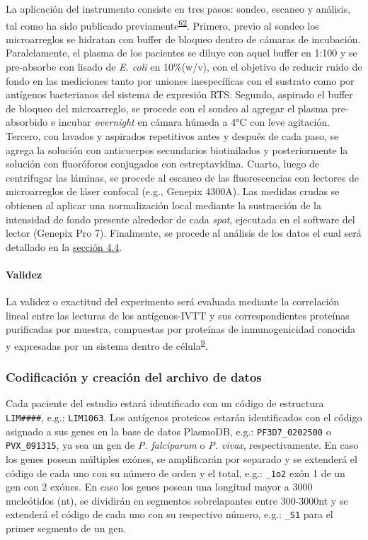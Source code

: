 \documentclass[a4paper]{article}
\let\oldparagraph\paragraph
\renewcommand{\paragraph}[1]{\oldparagraph{#1}\mbox{}}
\begin{document}
La aplicación del instrumento consiste en tres pasos: sondeo, escaneo y
análisis, tal como ha sido publicado
previamente\textsuperscript{\protect\hyperlink{ref-Driguez2015}{62}}.
Primero, previo al sondeo los microarreglos se hidratan con buffer de
bloqueo dentro de cámaras de incubación. Paralelamente, el plasma de los
pacientes se diluye con aquel buffer en 1:100 y se pre-absorbe con
lisado de \emph{E. coli} en 10\%(w/v), con el objetivo de reducir ruido
de fondo en las mediciones tanto por uniones inespecíficas con el
sustrato como por antígenos bacterianos del sistema de expresión RTS.
Segundo, aspirado el buffer de bloqueo del microarreglo, se procede con
el sondeo al agregar el plasma pre-absorbido e incubar \emph{overnight}
en cámara húmeda a 4°C con leve agitación. Tercero, con lavados y
aspirados repetitivos antes y después de cada paso, se agrega la
solución con anticuerpos secundarios biotinilados y posteriormente la
solución con fluoróforos conjugados con estreptavidina. Cuarto, luego de
centrifugar las láminas, se procede al escaneo de las fluorescencias con
lectores de microarreglos de láser confocal (e.g., Genepix 4300A). Las
medidas crudas se obtienen al aplicar una normalización local mediante
la sustracción de la intensidad de fondo presente alrededor de cada
\emph{spot}, ejecutada en el software del lector (Genepix Pro 7).
Finalmente, se procede al análisis de los datos el cual será detallado
en la \protect\hyperlink{anadata}{sección 4.4}.

\hypertarget{validez}{\paragraph{Validez}\label{validez}}

La validez o exactitud del experimento será evaluada mediante la
correlación lineal entre las lecturas de los antígenos-IVTT y sus
correspondientes proteínas purificadas por muestra, compuestas por
proteínas de inmunogenicidad conocida y expresadas por un sistema dentro
de célula\textsuperscript{\protect\hyperlink{ref-crompton2010}{9}}.

\subsubsection{Codificación y creación del archivo de
datos}\label{codificacion-y-creacion-del-archivo-de-datos}

Cada paciente del estudio estará identificado con un código de
estructura \texttt{LIM\#\#\#\#}, e.g.: \texttt{LIM1063}. Los antígenos
proteicos estarán identificados con el código asignado a sus genes en la
base de datos PlasmoDB, e.g.: \texttt{PF3D7\_0202500} o
\texttt{PVX\_091315}, ya sea un gen de \emph{P. falciparum} o \emph{P.
vivax}, respectivamente. En caso los genes posean múltiples exónes, se
amplificarán por separado y se extenderá el código de cada uno con su
número de orden y el total, e.g.: \texttt{\_1o2} exón 1 de un gen con 2
exónes. En caso los genes posean una longitud mayor a 3000 nucleótidos
(nt), se dividirán en segmentos sobrelapantes entre 300-3000nt y se
extenderá el código de cada uno con su respectivo número, e.g.:
\texttt{\_S1} para el primer segmento de un gen.
\end{document}
